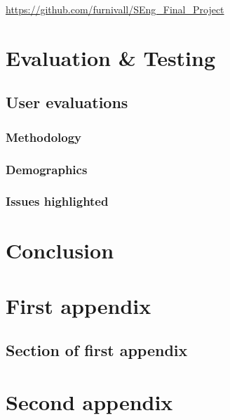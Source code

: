 \documentclass{mproj}
\begin{document}
\begin{center}
\href{https://github.com/furnivall/SEng_Final_Project}{https://github.com/furnivall/SEng\_Final\_Project}
\end{center}

\chapter{Evaluation \& Testing}\label{testing}
\section{User evaluations}
\subsection{Methodology}
\subsection{Demographics}
\subsection{Issues highlighted}
\chapter{Conclusion}\label{conclusion}
\appendix %
\chapter{First appendix}

\section{Section of first appendix}

\chapter{Second appendix}

\printbibliography
\end{document}
